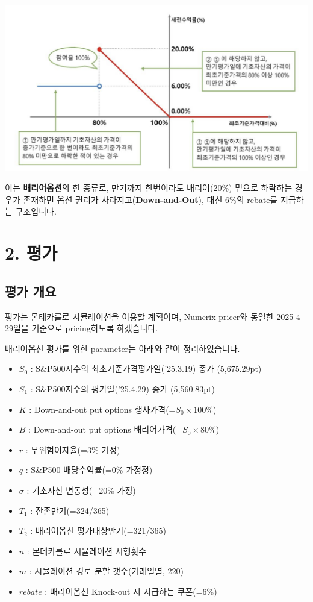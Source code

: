 \documentclass[
  a4paper,
  DIV=11,
  numbers=noendperiod]{scrreprt}
\providecommand{\tightlist}{%
  \setlength{\itemsep}{0pt}\setlength{\parskip}{0pt}}\usepackage{longtable,booktabs,array}
\begin{document}
\includegraphics{image/elb3.png}

이는 \textbf{배리어옵션}의 한 종류로, 만기까지 한번이라도 배리어(20\%)
밑으로 하락하는 경우가 존재하면 옵션 권리가
사라지고(\textbf{Down-and-Out}), 대신 6\%의 rebate를 지급하는
구조입니다.

\section*{2. 평가}\label{uxd3c9uxac00}


\subsection*{평가 개요}\label{uxd3c9uxac00-uxac1cuxc694}

평가는 몬테카를로 시뮬레이션을 이용할 계획이며, Numerix pricer와 동일한
2025-4-29일을 기준으로 pricing하도록 하겠습니다.

배리어옵션 평가를 위한 parameter는 아래와 같이 정리하였습니다.

\begin{itemize}
\tightlist
\item
  \(S_0\) : S\&P500지수의 최초기준가격평가일('25.3.19) 종가 (5,675.29pt)
\item
  \(S_1\) : S\&P500지수의 평가일('25.4.29) 종가 (5,560.83pt)
\item
  \(K\) : Down-and-out put options 행사가격(=\(S_0\times 100\%\))
\item
  \(B\) : Down-and-out put options 배리어가격(=\(S_0\times 80\%\))
\item
  \(r\) : 무위험이자율(=3\% 가정)
\item
  \(q\) : S\&P500 배당수익률(=0\% 가정정)
\item
  \(\sigma\) : 기초자산 변동성(=20\% 가정)
\item
  \(T_1\) : 잔존만기(=324/365)
\item
  \(T_2\) : 배리어옵션 평가대상만기(=321/365)
\item
  \(n\) : 몬테카를로 시뮬레이션 시행횟수
\item
  \(m\) : 시뮬레이션 경로 분할 갯수(거래일별, 220)
\item
  \(rebate\) : 배리어옵션 Knock-out 시 지급하는 쿠폰(=6\%)
\end{itemize}
\end{document}
